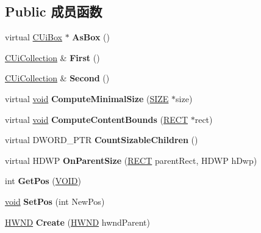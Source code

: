 \subsection*{Public 成员函数}
\begin{DoxyCompactItemize}
\item 
\mbox{\label{class_c_ui_split_panel_a42d610693a0f213ddd58c321bd53ecd3}} 
virtual \hyperlink{class_c_ui_box}{C\+Ui\+Box} $\ast$ {\bfseries As\+Box} ()
\item 
\mbox{\label{class_c_ui_split_panel_ac668ce047349b76d74b6729b5be55f4f}} 
\hyperlink{class_c_ui_collection}{C\+Ui\+Collection} \& {\bfseries First} ()
\item 
\mbox{\label{class_c_ui_split_panel_a5bc75d970ada038148f225c96c90dc39}} 
\hyperlink{class_c_ui_collection}{C\+Ui\+Collection} \& {\bfseries Second} ()
\item 
\mbox{\label{class_c_ui_split_panel_a388112c1a81d424d1c4298561d9d8096}} 
virtual \hyperlink{interfacevoid}{void} {\bfseries Compute\+Minimal\+Size} (\hyperlink{structtag_s_i_z_e}{S\+I\+ZE} $\ast$size)
\item 
\mbox{\label{class_c_ui_split_panel_a5b1c4370d1f416df99eb4e8234df882f}} 
virtual \hyperlink{interfacevoid}{void} {\bfseries Compute\+Content\+Bounds} (\hyperlink{structtag_r_e_c_t}{R\+E\+CT} $\ast$rect)
\item 
\mbox{\label{class_c_ui_split_panel_a3c8e19ab212e9ae09242fffa6852c681}} 
virtual D\+W\+O\+R\+D\+\_\+\+P\+TR {\bfseries Count\+Sizable\+Children} ()
\item 
\mbox{\label{class_c_ui_split_panel_a8717df3c066e199c8a535df224e3d996}} 
virtual H\+D\+WP {\bfseries On\+Parent\+Size} (\hyperlink{structtag_r_e_c_t}{R\+E\+CT} parent\+Rect, H\+D\+WP h\+Dwp)
\item 
\mbox{\label{class_c_ui_split_panel_ac6e008303d63b523dfaaf9173aa0df88}} 
int {\bfseries Get\+Pos} (\hyperlink{interfacevoid}{V\+O\+ID})
\item 
\mbox{\label{class_c_ui_split_panel_aae60bfbd61bf4f9c78109a18c7167135}} 
\hyperlink{interfacevoid}{void} {\bfseries Set\+Pos} (int New\+Pos)
\item 
\mbox{\label{class_c_ui_split_panel_aca78ffb5893659b7cf9112eff256266a}} 
\hyperlink{interfacevoid}{H\+W\+ND} {\bfseries Create} (\hyperlink{interfacevoid}{H\+W\+ND} hwnd\+Parent)
\end{DoxyCompactItemize}
